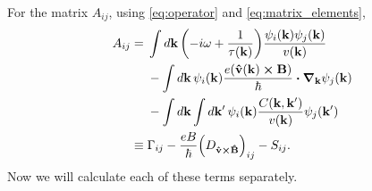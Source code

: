 \documentclass[12pt]{article}
\begin{document}
For the matrix $A_{ij}$, using \eqref{eq:operator} and \eqref{eq:matrix_elements},
\begin{align}
A_{ij} &= \begin{aligned}[t]
    &\int\dd{\vb{k}} \qty(-i\omega + \frac{1}{\tau(\vb{k})})
        \frac{\psi_i(\vb{k})\psi_j(\vb{k})}{v(\vb{k})} \\
    &-\int\dd{\vb{k}} \psi_i(\vb{k})\frac{e\qty(\vu{v}(\vb{k})\cross\vb{B})}{\hbar}
        \vdot\grad_{\vb{k}}\psi_j(\vb{k}) \\
    &- \int\dd{\vb{k}} \int\dd{\vb{k'}}
    \psi_i(\vb{k}) \frac{C(\vb{k},\vb{k'})}{v(\vb{k})} \psi_j(\vb{k'})
\end{aligned} \\
&\equiv \Gamma_{ij} - \frac{eB}{\hbar} \qty(D_{\vu{v}\cross\vu{B}})_{ij} - S_{ij}.
\end{align}
Now we will calculate each of these terms separately.
\end{document}
